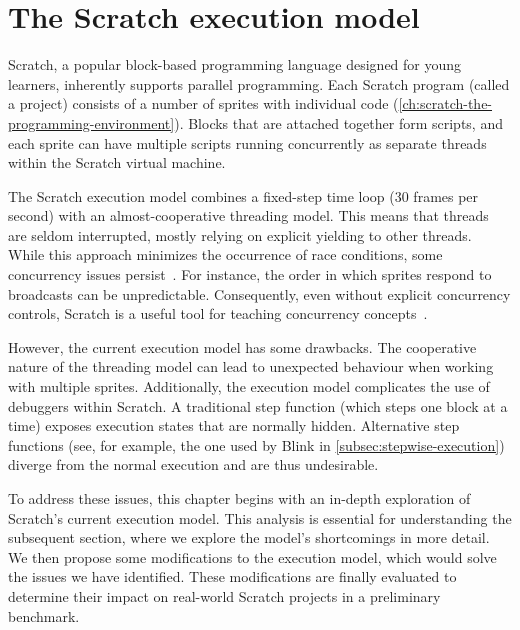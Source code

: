 \documentclass[../main]{subfiles}
\begin{document}
\chapter{The Scratch execution model}\label{ch:scratch-execution-model}


Scratch, a popular block-based programming language designed for young learners, inherently supports parallel programming.
Each Scratch program (called a project) consists of a number of sprites with individual code (\cref{ch:scratch-the-programming-environment}).
Blocks that are attached together form scripts, and each sprite can have multiple scripts running concurrently as separate threads within the Scratch virtual machine.

The Scratch execution model combines a fixed-step time loop (30 frames per second) with an almost-cooperative threading model.
This means that threads are seldom interrupted, mostly relying on explicit yielding to other threads.
While this approach minimizes the occurrence of race conditions, some concurrency issues persist~\autocite{maloneyScratchProgrammingLanguage2010}.
For instance, the order in which sprites respond to broadcasts can be unpredictable.
Consequently, even without explicit concurrency controls, Scratch is a useful tool for teaching concurrency concepts~\autocite{fatourouTeachingConcurrentProgramming2018}.

However, the current execution model has some drawbacks.
The cooperative nature of the threading model can lead to unexpected behaviour when working with multiple sprites.
Additionally, the execution model complicates the use of debuggers within Scratch.
A traditional step function (which steps one block at a time) exposes execution states that are normally hidden.
Alternative step functions (see, for example, the one used by Blink in \cref{subsec:stepwise-execution}) diverge from the normal execution and are thus undesirable.

To address these issues, this chapter begins with an in-depth exploration of Scratch's current execution model.
This analysis is essential for understanding the subsequent section, where we explore the model's shortcomings in more detail.
We then propose some modifications to the execution model, which would solve the issues we have identified.
These modifications are finally evaluated to determine their impact on real-world Scratch projects in a preliminary benchmark.
\end{document}
